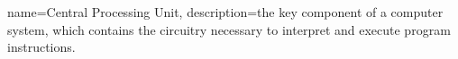 {   
    name={Central Processing Unit},
    description={the key component of a computer system, which contains the circuitry necessary to interpret and execute program instructions.}
}


